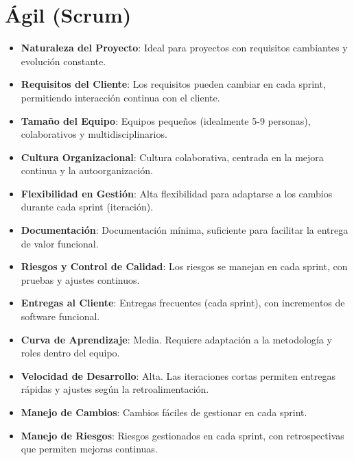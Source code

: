 \documentclass[main.tex]{subfiles}
\begin{document}
\section{Ágil (Scrum)}
\begin{itemize}
    \item \textbf{Naturaleza del Proyecto}: Ideal para proyectos con requisitos cambiantes y evolución constante.
    \item \textbf{Requisitos del Cliente}: Los requisitos pueden cambiar en cada sprint, permitiendo interacción continua con el cliente.
    \item \textbf{Tamaño del Equipo}: Equipos pequeños (idealmente 5-9 personas), colaborativos y multidisciplinarios.
    \item \textbf{Cultura Organizacional}: Cultura colaborativa, centrada en la mejora continua y la autoorganización.
    \item \textbf{Flexibilidad en Gestión}: Alta flexibilidad para adaptarse a los cambios durante cada sprint (iteración).
    \item \textbf{Documentación}: Documentación mínima, suficiente para facilitar la entrega de valor funcional.
    \item \textbf{Riesgos y Control de Calidad}: Los riesgos se manejan en cada sprint, con pruebas y ajustes continuos.
    \item \textbf{Entregas al Cliente}: Entregas frecuentes (cada sprint), con incrementos de software funcional.
    \item \textbf{Curva de Aprendizaje}: Media. Requiere adaptación a la metodología y roles dentro del equipo.
    \item \textbf{Velocidad de Desarrollo}: Alta. Las iteraciones cortas permiten entregas rápidas y ajustes según la retroalimentación.
    \item \textbf{Manejo de Cambios}: Cambios fáciles de gestionar en cada sprint.
    \item \textbf{Manejo de Riesgos}: Riesgos gestionados en cada sprint, con retrospectivas que permiten mejoras continuas.
\end{itemize}
\end{document}
